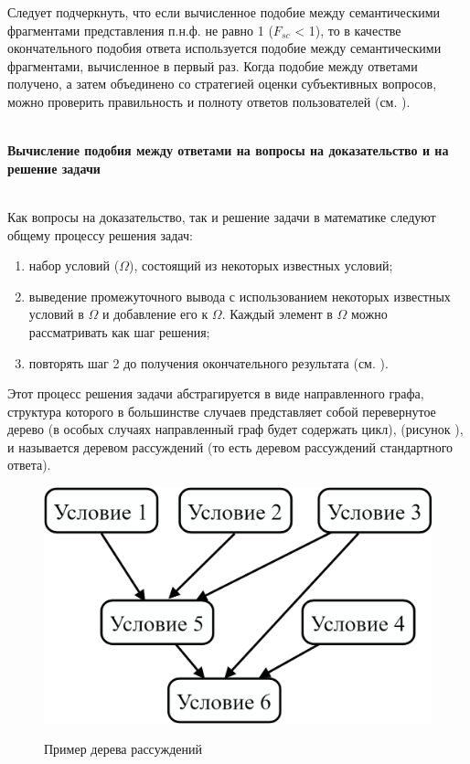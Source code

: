 Следует подчеркнуть, что если вычисленное подобие между семантическими фрагментами представления п.н.ф. не равно 1 ($F_{sc}$ < 1), то в качестве окончательного подобия ответа используется подобие между семантическими фрагментами, вычисленное в первый раз. Когда подобие между ответами получено, а затем объединено со стратегией оценки субъективных вопросов, можно проверить правильность и полноту ответов пользователей (см. ).

~\\
\textbf{Вычисление подобия между ответами на вопросы на доказательство и на решение задачи} 

~\\
Как вопросы на доказательство, так и решение задачи в математике следуют общему процессу решения задач:

\begin{enumerate}
	\item набор условий ($\Omega $), состоящий из некоторых известных условий;
	
	\item выведение промежуточного вывода с использованием некоторых известных условий в $\Omega $ и добавление его к $\Omega $. Каждый элемент в $\Omega $ можно рассматривать как шаг решения;
	
	\item повторять шаг 2 до получения окончательного результата (см. ).
\end{enumerate}

Этот процесс решения задачи абстрагируется в виде направленного графа, структура которого в большинстве случаев представляет собой перевернутое дерево (в особых случаях направленный граф будет содержать цикл), (рисунок \textit{}), и называется деревом рассуждений (то есть деревом рассуждений стандартного ответа).

\begin{figure}[H]
	\caption{Пример дерева рассуждений}
	\includegraphics[scale=0.15]{author/part7/figures/reasoning_tree_example.png}
	\label{fig:RT_example}
\end{figure}

